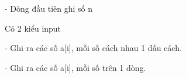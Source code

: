 - Dòng đầu tiên ghi số n

Có 2 kiểu input

- Ghi ra các số a[i], mỗi số cách nhau 1 dấu cách.

- Ghi ra các số a[i], mỗi số trên 1 dòng.